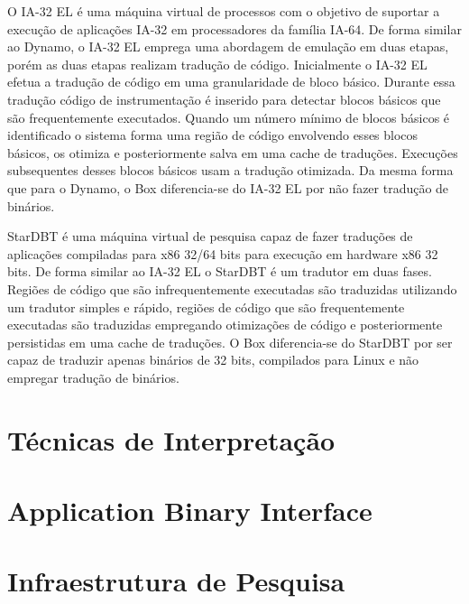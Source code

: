 \documentclass[11pt,twoside]{article}
\begin{document}
O IA-32 EL \cite{ia32el} é uma máquina virtual de processos com o objetivo de
suportar a execução de aplicações IA-32 em processadores da família IA-64.
De forma similar ao Dynamo, o IA-32 EL emprega uma abordagem de emulação em
duas etapas, porém as duas etapas realizam tradução de código. Inicialmente
o IA-32 EL efetua a tradução de código em uma granularidade de bloco básico.
Durante essa tradução código de instrumentação é inserido para detectar blocos
básicos que são frequentemente executados. Quando um número mínimo de blocos básicos
é identificado o sistema forma uma região de código envolvendo esses blocos
básicos, os otimiza e posteriormente salva em uma cache de traduções. Execuções
subsequentes desses blocos básicos usam a tradução otimizada. Da mesma forma que
para o Dynamo, o Box diferencia-se do IA-32 EL por não fazer tradução de binários.

StarDBT \cite{stardbt} é uma máquina virtual de pesquisa capaz de fazer traduções de
aplicações compiladas para x86 32/64 bits para execução em hardware x86 32 bits.
De forma similar ao IA-32 EL o StarDBT é um tradutor em duas fases. Regiões de
código que são infrequentemente executadas são traduzidas utilizando um tradutor
simples e rápido, regiões de código que são frequentemente executadas são traduzidas
empregando otimizações de código e posteriormente persistidas em uma cache de
traduções. O Box diferencia-se do StarDBT por ser capaz de traduzir apenas binários
de 32 bits, compilados para Linux e não empregar tradução de binários.

\section{Técnicas de Interpretação}


\section{Application Binary Interface}


\section{Infraestrutura de Pesquisa}
%
\end{document}
